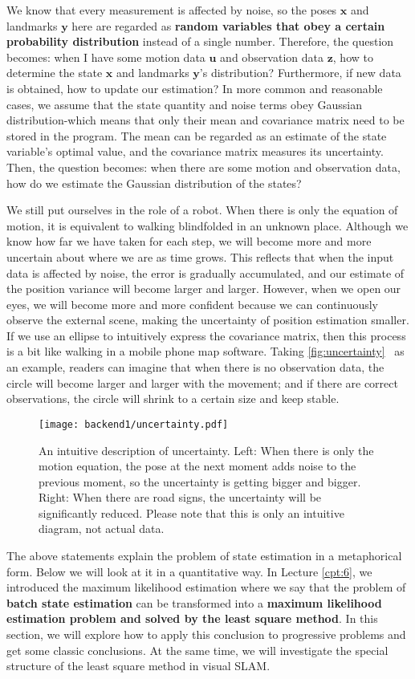 We know that every measurement is affected by noise, so the poses $\bm{x}$ and landmarks $\bm{y}$ here are regarded as \textbf{random variables that obey a certain probability distribution} instead of a single number. Therefore, the question becomes: when I have some motion data $\bm{u}$ and observation data $\bm{z}$, how to determine the state $\bm{x}$ and landmarks $\bm{y}$'s distribution? Furthermore, if new data is obtained, how to update our estimation? In more common and reasonable cases, we assume that the state quantity and noise terms obey Gaussian distribution-which means that only their mean and covariance matrix need to be stored in the program. The mean can be regarded as an estimate of the state variable's optimal value, and the covariance matrix measures its uncertainty. Then, the question becomes: when there are some motion and observation data, how do we estimate the Gaussian distribution of the states?

We still put ourselves in the role of a robot. When there is only the equation of motion, it is equivalent to walking blindfolded in an unknown place. Although we know how far we have taken for each step, we will become more and more uncertain about where we are as time grows. This reflects that when the input data is affected by noise, the error is gradually accumulated, and our estimate of the position variance will become larger and larger. However, when we open our eyes, we will become more and more confident because we can continuously observe the external scene, making the uncertainty of position estimation smaller. If we use an ellipse to intuitively express the covariance matrix, then this process is a bit like walking in a mobile phone map software. Taking \autoref{fig:uncertainty}~ as an example, readers can imagine that when there is no observation data, the circle will become larger and larger with the movement; and if there are correct observations, the circle will shrink to a certain size and keep stable.

\begin{figure}[!ht]
	\centering
	\texttt{[image: backend1/uncertainty.pdf]}
	\caption{An intuitive description of uncertainty. Left: When there is only the motion equation, the pose at the next moment adds noise to the previous moment, so the uncertainty is getting bigger and bigger. Right: When there are road signs, the uncertainty will be significantly reduced. Please note that this is only an intuitive diagram, not actual data.}
	\label{fig:uncertainty}
\end{figure}

The above statements explain the problem of state estimation in a metaphorical form. Below we will look at it in a quantitative way. In Lecture \ref{cpt:6}, we introduced the maximum likelihood estimation where we say that the problem of \textbf{batch state estimation} can be transformed into a \textbf{maximum likelihood estimation problem and solved by the least square method}. In this section, we will explore how to apply this conclusion to progressive problems and get some classic conclusions. At the same time, we will investigate the special structure of the least square method in visual SLAM.


